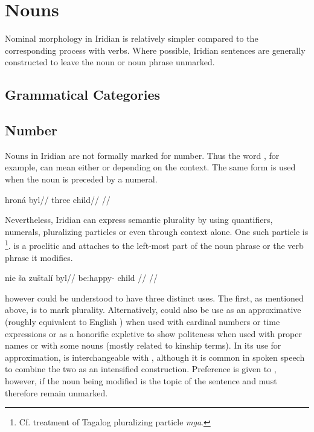 \chapter{Nouns}

Nominal morphology in Iridian is relatively simpler compared to the corresponding process with verbs. Where possible, Iridian sentences are generally constructed to leave the noun or noun phrase unmarked.

\section{Grammatical Categories}

\section{Number}

Nouns in Iridian are not formally marked for number. Thus the word , for example, can mean either  or  depending on the context. The same form is used when the noun is preceded by a numeral.

\pex
\begingl
\gla hroná byl//
\glb three child//
\glft {}//
\endgl
\xe

Nevertheless, Iridian can express semantic plurality by using quantifiers, numerals, pluralizing particles or even through context alone. One such particle is \label{sec:plurals}\footnote{Cf.  treatment of Tagalog pluralizing particle \emph{mga}.}.  is a proclitic and attaches to the left-most part of the noun phrase or the verb phrase it modifies.

\pex
\begingl
    \gla nie ša zuštalí byl//
    \glb {}  be:happy- child //
    \glft {}//
\endgl
\xe

 however could be understood to have three distinct uses. The first, as mentioned above, is to mark plurality. Alternatively,  could also be use as an approximative (roughly equivalent to English ) when used with cardinal numbers or time expressions or as a honorific expletive to show politeness when used with proper names or with some nouns (mostly related to kinship terms). In its use for approximation,  is interchangeable with , although it is common in spoken speech to combine the two as an intensified construction. Preference is given to , however, if the noun being modified is the topic of the sentence and must therefore remain unmarked.

